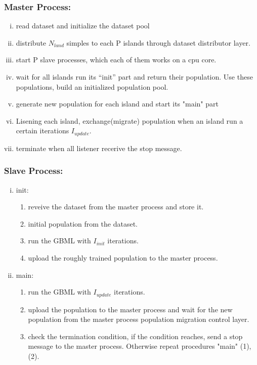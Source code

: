 \documentclass[conference]{IEEEtran}
\begin{document}
		\subsubsection{Master Process:}	
		\begin{enumerate}[(i)]
			\item read dataset and initialize the dataset pool 
			\item distribute $N_{land}$ simples to each P islands through dataset distributor layer.
			\item start P slave processes, which each of them works on a cpu core.
			\item wait for all islands run its “init” part and return their population. Use these populations, build an initialized population pool.
			\item generate new population for each island and start its "main" part
			\item Lisening each island, exchange(migrate) population when an island run a certain iterations $I_{update}$.
			\item terminate when all listener recerive the stop message.
		\end{enumerate}

		\subsubsection{Slave Process:}
			\begin{enumerate}[(i)]
				\item init:
				\begin{enumerate}[(1)]
					\item reveive the dataset from the master process and store it.
					\item initial population from the dataset.
					\item run the GBML with $I_{init}$ iterations.
					\item upload the roughly trained population to the master process.
				\end{enumerate}
				\item main:	
				\begin{enumerate}[(1)]
					\item run the GBML with $I_{update}$ iterations.
					\item upload the population to the master process and wait for the new population from the master process population migration control layer.
					\item check the termination condition, if the condition reaches, send a stop message to the master process.
					Otherwise repeat procedures "main" (1),(2).
					
									
				\end{enumerate}
			\end{enumerate}
\end{document}

